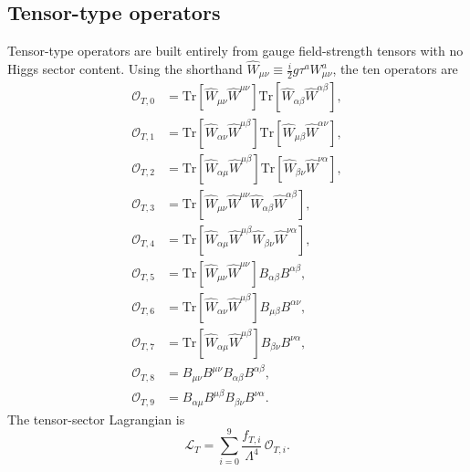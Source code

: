 \subsection{Tensor-type operators}

Tensor-type operators are built entirely from gauge field-strength tensors with no Higgs sector content. Using the shorthand $\hat{W}_{\mu\nu}\equiv\tfrac{i}{2}g\tau^a W_{\mu\nu}^a$, the ten operators are \cite{Eboli_2016}
\begin{align}
\mathcal{O}_{T,0} &= \mathrm{Tr}\!\left[\hat{W}_{\mu\nu}\hat{W}^{\mu\nu}\right] \mathrm{Tr}\!\left[\hat{W}_{\alpha\beta}\hat{W}^{\alpha\beta}\right], \\[3pt] \mathcal{O}_{T,1} &= \mathrm{Tr}\!\left[\hat{W}_{\alpha\nu}\hat{W}^{\mu\beta}\right] \mathrm{Tr}\!\left[\hat{W}_{\mu\beta}\hat{W}^{\alpha\nu}\right], \\[3pt] \mathcal{O}_{T,2} &= \mathrm{Tr}\!\left[\hat{W}_{\alpha\mu}\hat{W}^{\mu\beta}\right] \mathrm{Tr}\!\left[\hat{W}_{\beta\nu}\hat{W}^{\nu\alpha}\right], \\[3pt] \mathcal{O}_{T,3} &= \mathrm{Tr}\!\left[\hat{W}_{\mu\nu}\hat{W}^{\mu\nu}\hat{W}_{\alpha\beta}\hat{W}^{\alpha\beta}\right], \\[3pt] \mathcal{O}_{T,4} &= \mathrm{Tr}\!\left[\hat{W}_{\alpha\mu}\hat{W}^{\mu\beta}\hat{W}_{\beta\nu}\hat{W}^{\nu\alpha}\right], \\[3pt] \mathcal{O}_{T,5} &= \mathrm{Tr}\!\left[\hat{W}_{\mu\nu}\hat{W}^{\mu\nu}\right] B_{\alpha\beta}B^{\alpha\beta}, \\[3pt] \mathcal{O}_{T,6} &= \mathrm{Tr}\!\left[\hat{W}_{\alpha\nu}\hat{W}^{\mu\beta}\right] B_{\mu\beta}B^{\alpha\nu}, \\[3pt] \mathcal{O}_{T,7} &= \mathrm{Tr}\!\left[\hat{W}_{\alpha\mu}\hat{W}^{\mu\beta}\right] B_{\beta\nu}B^{\nu\alpha}, \\[3pt] \mathcal{O}_{T,8} &= B_{\mu\nu}B^{\mu\nu}B_{\alpha\beta}B^{\alpha\beta}, \\[3pt] \mathcal{O}_{T,9} &= B_{\alpha\mu}B^{\mu\beta}B_{\beta\nu}B^{\nu\alpha}.
\end{align}
The tensor-sector Lagrangian is
\begin{equation}
\mathcal{L}_{T} = \sum_{i=0}^{9} \frac{f_{T,i}}{\Lambda^{4}}\,\mathcal{O}_{T,i}.
\end{equation}
